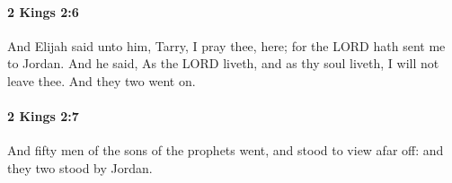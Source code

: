 		\paragraph{2 Kings 2:6} %
			\label{2KINGS-2-6}

			And Elijah said unto him, Tarry, I pray thee, here; for the LORD hath sent me to Jordan. And he said, As the LORD liveth, and as thy soul liveth, I will not leave thee. And they two went on.


		\paragraph{2 Kings 2:7} %
			\label{2KINGS-2-7}

			And fifty men of the sons of the prophets went, and stood to view afar off: and they two stood by Jordan.


